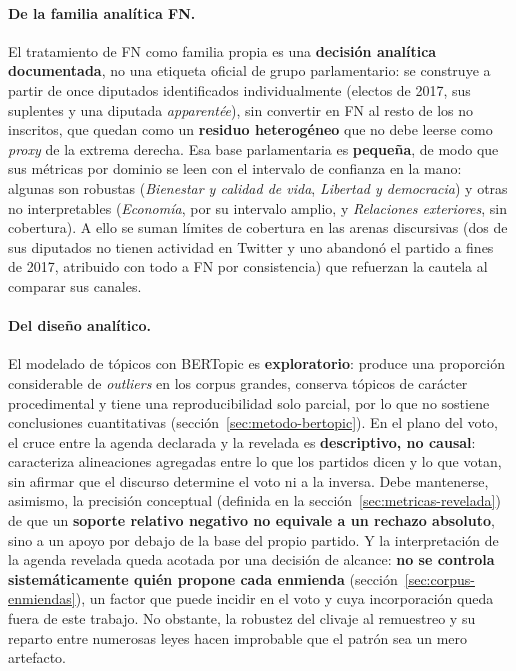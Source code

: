 \paragraph{De la familia analítica FN.}
El tratamiento de FN como familia propia es una \textbf{decisión analítica
documentada}, no una etiqueta oficial de grupo parlamentario: se construye a
partir de once diputados identificados individualmente (electos de 2017, sus
suplentes y una diputada \emph{apparentée}), sin convertir en FN al resto de los
no inscritos, que quedan como un \textbf{residuo heterogéneo} que no debe leerse
como \emph{proxy} de la extrema derecha. Esa base parlamentaria es
\textbf{pequeña}, de modo que sus métricas por dominio se leen con el intervalo de
confianza en la mano: algunas son robustas (\emph{Bienestar y calidad de vida},
\emph{Libertad y democracia}) y otras no interpretables (\emph{Economía}, por su
intervalo amplio, y \emph{Relaciones exteriores}, sin cobertura). A ello se suman
límites de cobertura en las arenas discursivas (dos de sus diputados no tienen
actividad en Twitter y uno abandonó el partido a fines de 2017, atribuido con
todo a FN por consistencia) que refuerzan la cautela al comparar sus canales.

\paragraph{Del diseño analítico.}
El modelado de tópicos con BERTopic es \textbf{exploratorio}: produce una
proporción considerable de \emph{outliers} en los corpus grandes, conserva
tópicos de carácter procedimental y tiene una reproducibilidad solo parcial, por
lo que no sostiene conclusiones cuantitativas (sección~\ref{sec:metodo-bertopic}).
En el plano del voto, el cruce entre la agenda declarada y la revelada es
\textbf{descriptivo, no causal}: caracteriza alineaciones agregadas entre lo que
los partidos dicen y lo que votan, sin afirmar que el discurso determine el voto
ni a la inversa. Debe mantenerse, asimismo, la precisión conceptual (definida en la
sección~\ref{sec:metricas-revelada}) de que un \textbf{soporte relativo negativo
no equivale a un rechazo absoluto}, sino a un apoyo por debajo de la base del
propio partido. Y la interpretación de la agenda revelada
queda acotada por una decisión de alcance: \textbf{no se controla sistemáticamente
quién propone cada enmienda} (sección~\ref{sec:corpus-enmiendas}), un factor que
puede incidir en el voto y cuya incorporación queda fuera de este trabajo. No
obstante, la robustez del clivaje al remuestreo y su reparto entre numerosas leyes
hacen improbable que el patrón sea un mero artefacto.

